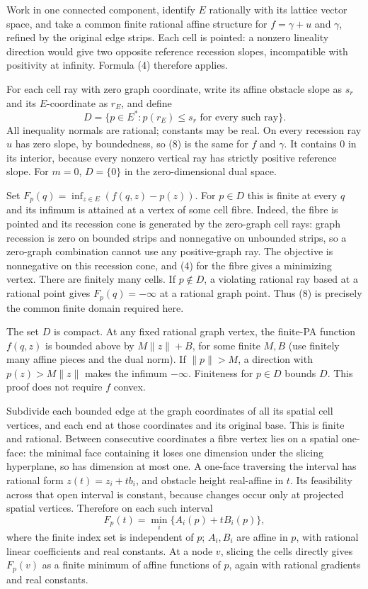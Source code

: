 \documentclass[
  11pt,
]{article}
\begin{document}
Work in one connected component, identify \(E\) rationally with its
lattice vector space, and take a common finite rational affine structure
for \(f=\gamma+u\) and \(\gamma\), refined by the original edge strips.
Each cell is pointed: a nonzero lineality direction would give two
opposite reference recession slopes, incompatible with positivity at
infinity. Formula (4) therefore applies.

For each cell ray with zero graph coordinate, write its affine obstacle
slope as \(s_r\) and its \(E\)-coordinate as \(r_E\), and define \[
 D=\{p\in E^*:p(r_E)\leq s_r\text{ for every such ray}\}.                    \tag{8}
\] All inequality normals are rational; constants may be real. On every
recession ray \(u\) has zero slope, by boundedness, so (8) is the same
for \(f\) and \(\gamma\). It contains 0 in its interior, because every
nonzero vertical ray has strictly positive reference slope. For \(m=0\),
\(D=\{0\}\) in the zero-dimensional dual space.

Set \(F_p(q)=\inf_{z\in E}(f(q,z)-p(z))\). For \(p\in D\) this is finite
at every \(q\) and its infimum is attained at a vertex of some cell
fibre. Indeed, the fibre is pointed and its recession cone is generated
by the zero-graph cell rays: graph recession is zero on bounded strips
and nonnegative on unbounded strips, so a zero-graph combination cannot
use any positive-graph ray. The objective is nonnegative on this
recession cone, and (4) for the fibre gives a minimizing vertex. There
are finitely many cells. If \(p\notin D\), a violating rational ray
based at a rational point gives \(F_p(q)=-\infty\) at a rational graph
point. Thus (8) is precisely the common finite domain required here.

The set \(D\) is compact. At any fixed rational graph vertex, the
finite-PA function \(f(q,z)\) is bounded above by \(M\|z\|+B\), for some
finite \(M,B\) (use finitely many affine pieces and the dual norm). If
\(\|p\|>M\), a direction with \(p(z)>M\|z\|\) makes the infimum
\(-\infty\). Finiteness for \(p\in D\) bounds \(D\). This proof does not
require \(f\) convex.

Subdivide each bounded edge at the graph coordinates of all its spatial
cell vertices, and each end at those coordinates and its original base.
This is finite and rational. Between consecutive coordinates a fibre
vertex lies on a spatial one-face: the minimal face containing it loses
one dimension under the slicing hyperplane, so has dimension at most
one. A one-face traversing the interval has rational form
\(z(t)=z_i+t b_i\), and obstacle height real-affine in \(t\). Its
feasibility across that open interval is constant, because changes occur
only at projected spatial vertices. Therefore on each such interval \[
 F_p(t)=\min_i\{A_i(p)+t B_i(p)\},                      \tag{9}
\] where the finite index set is independent of \(p\); \(A_i,B_i\) are
affine in \(p\), with rational linear coefficients and real constants.
At a node \(v\), slicing the cells directly gives \(F_p(v)\) as a finite
minimum of affine functions of \(p\), again with rational gradients and
real constants.
\end{document}
